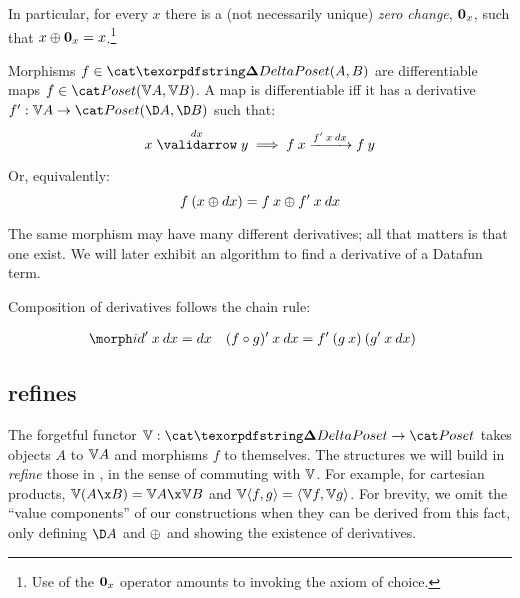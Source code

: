 \documentclass[nomarginums]{rntz}\usepackage[tablet]{fantasy}%
\begin{document}
\noindent In particular, for every $x$ there is a (not necessarily unique)
\emph{zero change}, $\boldsymbol{0}_x$, such that $x \mathbin{\oplus} \boldsymbol{0}_x = x$.\footnote{Use of
  the $\boldsymbol{0}_x$ operator amounts to invoking the axiom of choice.}

Morphisms $f \in \CP(A,B)$ are differentiable maps $f \in \Poset(\vals A, \vals
B)$. A map is differentiable iff it has a derivative $\deriv f : \vals A \to
\Poset(\chgs A, \chgs B)$ such that:
%
\[ \vld{\dx} x y \implies \longvld{\deriv f\<x\<\dx}{f\<x}{f\<y}\]

\noindent Or, equivalently:
%
\[ f\<(x \upd \dx) = f\<x \upd \deriv f\<x\<\dx \]


\noindent
The same morphism may have many different derivatives; all that matters is that
one exist. We will later exhibit an algorithm to find a derivative of a Datafun
term.

Composition of derivatives follows the chain rule:

\begin{align*}
  \deriv\id \<x\<\dx &= \dx
  & \deriv{(f \circ g)} \<x\<\dx &= \deriv f \<(g\<x) \<(\deriv g\<x\<\dx)
\end{align*}





\subsection{\CP{} refines \Poset{}}
\label{sec:refines}

The forgetful functor $\valfn : \CP \to \Poset$ takes objects $A$ to $\mathbb{V}{A}$
and morphisms $f$ to themselves. The structures we will build in \CP{}
\emph{refine} those in \Poset{}, in the sense of commuting with $\mathbb{V}$. For
example, for cartesian products, $\vals{(A \x B)} = \vals{A} \x \vals{B}$ and
$\mathbb{V}{\langle{f,g}\rangle} = \langle{\ensuremath{\mathbb{V}}f, \ensuremath{\mathbb{V}}g}\rangle$.
%
For brevity, we omit the ``value components'' of our constructions when they can
be derived from this fact, only defining $\chgs{A}$ and $\mathbin{\oplus}$ and showing the
existence of derivatives.
\end{document}

